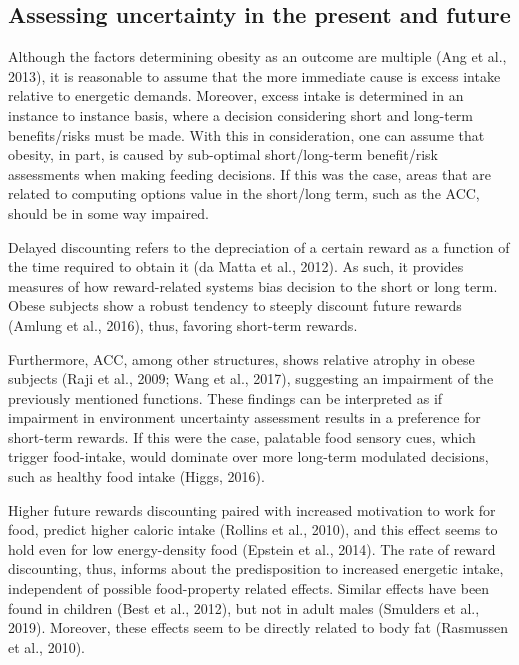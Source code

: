 \documentclass[
]{/home/nicoluarte/Downloads/templates/PNAS-template-main.tex}
\begin{document}
\hypertarget{assessing-uncertainty-in-the-present-and-future}{%
\subsection{Assessing uncertainty in the present and
future}\label{assessing-uncertainty-in-the-present-and-future}}

Although the factors determining obesity as an outcome are multiple (Ang
et al., 2013), it is reasonable to assume that the more immediate cause
is excess intake relative to energetic demands. Moreover, excess intake
is determined in an instance to instance basis, where a decision
considering short and long-term benefits/risks must be made. With this
in consideration, one can assume that obesity, in part, is caused by
sub-optimal short/long-term benefit/risk assessments when making feeding
decisions. If this was the case, areas that are related to computing
options value in the short/long term, such as the ACC, should be in some
way impaired.

Delayed discounting refers to the depreciation of a certain reward as a
function of the time required to obtain it (da Matta et al., 2012). As
such, it provides measures of how reward-related systems bias decision
to the short or long term. Obese subjects show a robust tendency to
steeply discount future rewards (Amlung et al., 2016), thus, favoring
short-term rewards.

Furthermore, ACC, among other structures, shows relative atrophy in
obese subjects (Raji et al., 2009; Wang et al., 2017), suggesting an
impairment of the previously mentioned functions. These findings can be
interpreted as if impairment in environment uncertainty assessment
results in a preference for short-term rewards. If this were the case,
palatable food sensory cues, which trigger food-intake, would dominate
over more long-term modulated decisions, such as healthy food intake
(Higgs, 2016).

Higher future rewards discounting paired with increased motivation to
work for food, predict higher caloric intake (Rollins et al., 2010), and
this effect seems to hold even for low energy-density food (Epstein et
al., 2014). The rate of reward discounting, thus, informs about the
predisposition to increased energetic intake, independent of possible
food-property related effects. Similar effects have been found in
children (Best et al., 2012), but not in adult males (Smulders et al.,
2019). Moreover, these effects seem to be directly related to body fat
(Rasmussen et al., 2010).
\end{document}
